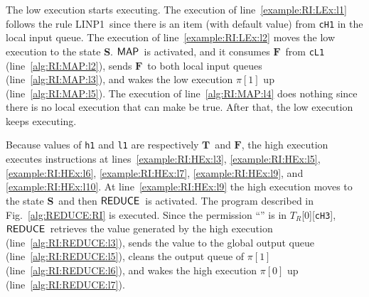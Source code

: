 \documentclass[10pt,a4paper,oneside]{article}
\def\sS{\textbf{S}}
\def\TPV{\ensuremath{T_{R}}}
\def\VTRUE{\ensuremath{\textbf{T}}}
\def\VFALSE{\ensuremath{\textbf{F}}}
\def\sanserif#1{\ensuremath{\sf #1}}
\def\REDUCE{\ensuremath{\sanserif{REDUCE}}}
\def\MAP{\ensuremath{\sanserif{MAP}}}
\def\Prog{\ensuremath{\pi}}
\def\Progl#1{\ensuremath{\Prog[#1]}}
\def\RINPUTYL{LINP1}
\def\linecode#1{{\texttt{#1}}}
\begin{document}
The low execution starts executing. The execution of line~\ref{example:RI:LEx:l1} follows the rule \RINPUTYL\ since there is an item (with default value) from \linecode{cH1} in the local input queue. The execution of line~\ref{example:RI:LEx:l2} moves the low execution to the state \sS. \MAP\ is activated, and it consumes \VFALSE\ from \linecode{cL1} (line~\ref{alg:RI:MAP:l2}), sends \VFALSE\ to both local input queues (line~\ref{alg:RI:MAP:l3}), and wakes the low execution \Progl{1} up (line~\ref{alg:RI:MAP:l5}). The execution of line~\ref{alg:RI:MAP:l4} does nothing since there is no local execution that can make  be true. After that, the low execution keeps executing.

Because values of \linecode{h1} and \linecode{l1} are respectively \VTRUE\ and \VFALSE, the high execution executes instructions at lines~\ref{example:RI:HEx:l3}, \ref{example:RI:HEx:l5}, \ref{example:RI:HEx:l6}, \ref{example:RI:HEx:l7}, \ref{example:RI:HEx:l9}, and \ref{example:RI:HEx:l10}. At line~\ref{example:RI:HEx:l9} the high execution moves to the state \sS\ and then \REDUCE\ is activated. The program described in Fig.~\ref{alg:REDUCE:RI} is executed. Since the permission ``'' is in \TPV[0][\linecode{cH3}], \REDUCE\ retrieves the value generated by the high execution (line~\ref{alg:RI:REDUCE:l3}), sends the value to the global output queue (line~\ref{alg:RI:REDUCE:l5}), cleans the output queue of \Progl{1} (line~\ref{alg:RI:REDUCE:l6}), and wakes the high execution \Progl{0} up (line~\ref{alg:RI:REDUCE:l7}).
\end{document}
